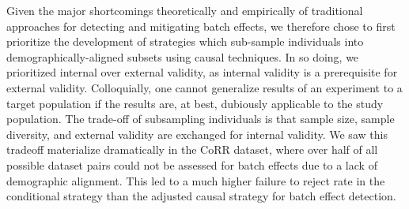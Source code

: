 Given the major shortcomings theoretically and empirically of traditional approaches for detecting and mitigating batch effects, we therefore chose to first prioritize the development of strategies which sub-sample individuals into demographically-aligned subsets using causal techniques. In so doing, we prioritized internal over external validity, as internal validity is a prerequisite for external validity. Colloquially, one cannot generalize results of an experiment to a target population if the results are, at best, dubiously applicable to the study population. The trade-off of subsampling individuals is that sample size, sample diversity, and  external validity are exchanged for internal validity. We saw this tradeoff materialize dramatically in the CoRR dataset, where over half of all possible dataset pairs could not be assessed for batch effects due to a lack of demographic alignment. This led to a much higher failure to reject rate in the conditional strategy than the adjusted causal strategy for batch effect detection.

